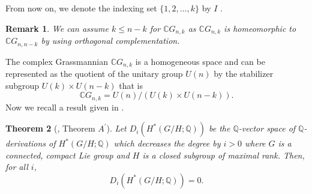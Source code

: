 \documentclass{amsart}
\newtheorem{theorem}{Theorem}[section]
\newtheorem{remark}[theorem]{Remark}
\newcommand{\rank}{\mathrm{Rank}}
\begin{document}
	From %
now on, we %
denote the indexing set $\{1,2,\dots, k\}$ by $I$%
.
	\begin{remark}
		We can assume  $k\leq n-k$ for  $\mathbb{C}G_{n,k}$ as $\mathbb{C}G_{n,k}$ is homeomorphic to $\mathbb{C}G_{n,n-k}$ by using orthogonal complementation.
	\end{remark}
	The %
complex Grassmannian $\mathbb{C}G_{n,k}$ is a homogeneous space and can be represented as the quotient of the unitary group $U(n)$ by the stabilizer subgroup %
$U(k)\times U(n-k)$ that is 
	\begin{equation}\label{cgn as hom}
		\mathbb{C}G_{n,k} = U(n)/ (U(k)\times U(n-k)). 
	\end{equation} Now %
we recall a result given %
in \cite{shiga-tezuka}.    
	\begin{theorem}[\cite{shiga-tezuka}, Theorem \(A^{'}\)]\label{Tezuka}
		Let %
$D_i(H^*(G/H;\mathbb{Q}))$ be the $\mathbb{Q}$-vector space of $\mathbb{Q}$-derivations of $H^*(G/H;\mathbb{Q})$ which decreases the degree %
by $i>0$ where %
$G$ is %
a connected, compact Lie group and $H$ is a closed subgroup of maximal rank.
		Then, for %
all $i$, $$D_i(H^*(G/H;\mathbb{Q})) =0.$$  
	\end{theorem}
\end{document}
